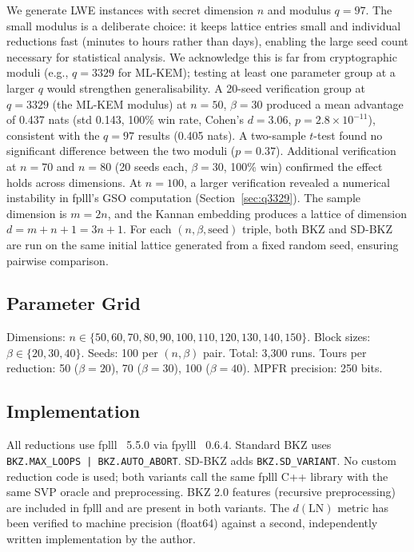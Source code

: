 \documentclass[journal=cic,version=preprint]{iacrj}
\begin{document}
We generate LWE instances with secret dimension $n$ and modulus $q=97$. The small modulus is a deliberate choice: it keeps lattice entries small and individual reductions fast (minutes to hours rather than days), enabling the large seed count necessary for statistical analysis. We acknowledge this is far from cryptographic moduli (e.g., $q=3329$ for ML-KEM); testing at least one parameter group at a larger $q$ would strengthen generalisability. A 20-seed verification group at $q=3329$ (the ML-KEM modulus) at $n=50$, $\beta=30$ produced a mean advantage of 0.437 nats (std 0.143, 100\% win rate, Cohen's $d=3.06$, $p=2.8\times 10^{-11}$), consistent with the $q=97$ results (0.405 nats). A two-sample $t$-test found no significant difference between the two moduli ($p=0.37$). Additional verification at $n=70$ and $n=80$ (20 seeds each, $\beta=30$, 100\% win) confirmed the effect holds across dimensions. At $n=100$, a larger verification revealed a numerical instability in fplll's GSO computation (Section~\ref{sec:q3329}). The sample dimension is $m=2n$, and the Kannan embedding produces a lattice of dimension $d = m+n+1 = 3n+1$. For each $(n, \beta, \mathrm{seed})$ triple, both BKZ and SD-BKZ are run on the same initial lattice generated from a fixed random seed, ensuring pairwise comparison.

\subsection{Parameter Grid}

\begin{sloppypar}
Dimensions: $n \in \{50, 60, 70, 80, 90, 100, 110, 120, 130, 140, 150\}$. Block sizes: $\beta \in \{20, 30, 40\}$. Seeds: 100 per $(n, \beta)$ pair. Total: 3{,}300 runs. Tours per reduction: 50 ($\beta=20$), 70 ($\beta=30$), 100 ($\beta=40$). MPFR precision: 250 bits.
\end{sloppypar}

\subsection{Implementation}

All reductions use fplll~\cite{fplll} 5.5.0 via fpylll~\cite{fpylll} 0.6.4. Standard BKZ uses \texttt{BKZ.MAX\_LOOPS\,|\,BKZ.AUTO\_ABORT}. SD-BKZ adds \texttt{BKZ.SD\_VARIANT}. No custom reduction code is used; both variants call the same fplll C++ library with the same SVP oracle and preprocessing. BKZ 2.0 features (recursive preprocessing) are included in fplll and are present in both variants. The $d(\mathrm{LN})$ metric has been verified to machine precision (float64) against a second, independently written implementation by the author.
\end{document}
